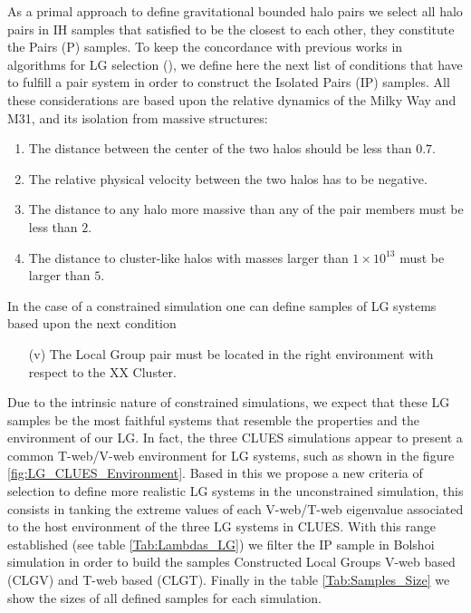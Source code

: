\documentclass[usenatbib]{latex/mn2e}
\begin{document}
As a primal approach to define gravitational bounded halo pairs we select 
all halo pairs in IH samples that satisfied to be the closest to each 
other, they constitute the Pairs (P) samples. To keep the concordance with
previous works in algorithms for LG selection (\SRKED{[references here}), 
we define here the next list of conditions that have to fulfill a pair 
system in order to construct the Isolated Pairs (IP) samples. All these 
considerations are based upon the relative dynamics of the Milky Way and 
M31, and its isolation from massive structures:



\begin{enumerate}

\item{The distance between the center of the two halos should be less than 
$0.7$\hMpc.}

\item{The relative physical velocity between the two halos has to be 
negative.}

\item{The distance to any halo more massive than any of the pair members 
must be less than $2$\hMpc.}

\item{The distance to cluster-like halos with masses larger than 
$1\times10^{13}$ \hMsun must be larger than $5$\hMpc.}
\end{enumerate}


In the case of a constrained simulation one can define samples of LG 
systems based upon the next condition


\begin{enumerate}
\item[(v)]{The Local Group pair must be located in the right environment 
with respect to the XX Cluster.}
\end{enumerate}



Due to the intrinsic nature of constrained simulations, we expect that 
these LG samples be the most faithful systems that resemble the properties
and the environment of our LG. In fact, the three CLUES simulations appear 
to present a common T-web/V-web environment for LG systems, such as shown 
in the figure \ref{fig:LG_CLUES_Environment}. Based in this we propose a 
new criteria of selection to define more realistic LG systems in the
unconstrained simulation, this consists in tanking the extreme values of 
each V-web/T-web eigenvalue associated to the host environment of the three 
LG systems in CLUES. With this range established (see table 
\ref{Tab:Lambdas_LG}) we filter the IP sample in Bolshoi simulation in 
order to build the samples Constructed Local Groups V-web based (CLGV) 
and T-web based (CLGT). Finally in the table \ref{Tab:Samples_Size} we 
show the sizes of all defined samples for each simulation.
\end{document}
